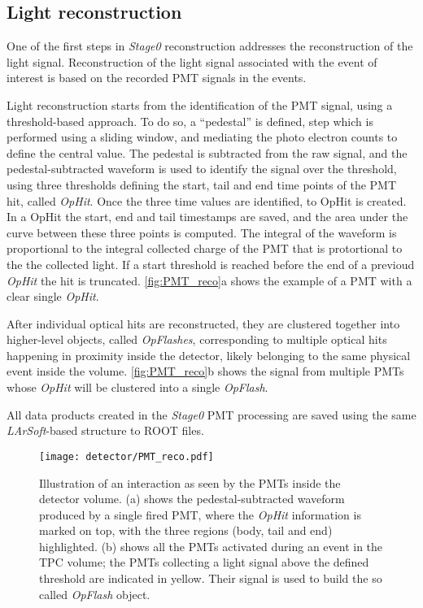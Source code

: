\subsection{Light reconstruction}

One of the first steps in \emph{Stage0} reconstruction addresses the reconstruction of the light signal. Reconstruction of the light signal associated with the event of interest is based on the recorded PMT signals in the events.

Light reconstruction starts from the identification of the PMT signal, using a threshold-based approach. To do so, a ``pedestal'' is defined, step which is performed using a sliding window, and mediating the photo electron counts to define the central value. The pedestal is subtracted from the raw signal, and the pedestal-subtracted waveform is used to identify the signal over the threshold, using three thresholds defining the start, tail and end time points of the PMT hit, called \emph{OpHit}. Once the three time values are identified, to OpHit is created. In a OpHit the start, end and tail timestamps are saved, and the area under the curve between these three points is computed. The integral of the waveform is proportional to the integral collected charge of the PMT that is protortional to the the collected light. If a start threshold is reached before the end of a previoud \emph{OpHit} the hit is truncated. \autoref{fig:PMT_reco}a shows the example of a PMT with a clear single \emph{OpHit}. 

After individual optical hits are reconstructed, they are clustered together into higher-level objects, called \emph{OpFlashes}, corresponding to multiple optical hits happening in proximity inside the detector, likely belonging to the same physical event inside the volume. \autoref{fig:PMT_reco}b shows the signal from multiple PMTs whose \emph{OpHit} will be clustered into a single \emph{OpFlash}.

All data products created in the \emph{Stage0} PMT processing are saved using the same \emph{LArSoft}-based structure to ROOT files. 

\begin{figure}
    \centering
    \texttt{[image: detector/PMT\_reco.pdf]}
    \caption[PMT reconstructed \emph{OpHits}]{Illustration of an interaction as seen by the PMTs inside the detector volume. (a) shows the pedestal-subtracted waveform produced by a single fired PMT, where the \emph{OpHit} information is marked on top, with the three regions (body, tail and end) highlighted. (b) shows all the PMTs activated during an event in the TPC volume; the PMTs collecting a light signal above the defined threshold are indicated in yellow. Their signal is used to build the so called \emph{OpFlash} object.}
    \label{fig:PMT_reco}
\end{figure}


